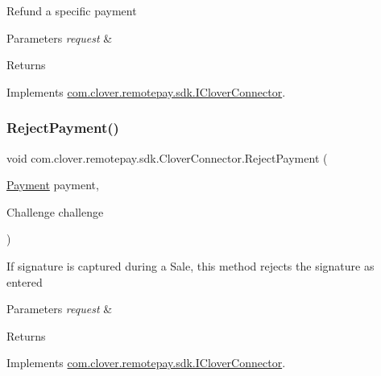 Refund a specific payment 


\begin{DoxyParams}{Parameters}
{\em request} & \\
\hline
\end{DoxyParams}
\begin{DoxyReturn}{Returns}

\end{DoxyReturn}


Implements \hyperlink{interfacecom_1_1clover_1_1remotepay_1_1sdk_1_1_i_clover_connector_aaa44684c7bf2c04b88ead61034c7c273}{com.\+clover.\+remotepay.\+sdk.\+I\+Clover\+Connector}.

\mbox{\label{classcom_1_1clover_1_1remotepay_1_1sdk_1_1_clover_connector_a2ffc66f46fddbf37d780ca269dd3b562}} 
\subsubsection{\texorpdfstring{Reject\+Payment()}{RejectPayment()}}
{\footnotesize\ttfamily void com.\+clover.\+remotepay.\+sdk.\+Clover\+Connector.\+Reject\+Payment (\begin{DoxyParamCaption}\item[{\hyperlink{classcom_1_1clover_1_1sdk_1_1v3_1_1payments_1_1_payment}{Payment}}]{payment,  }\item[{Challenge}]{challenge }\end{DoxyParamCaption})}



If signature is captured during a Sale, this method rejects the signature as entered 


\begin{DoxyParams}{Parameters}
{\em request} & \\
\hline
\end{DoxyParams}
\begin{DoxyReturn}{Returns}

\end{DoxyReturn}


Implements \hyperlink{interfacecom_1_1clover_1_1remotepay_1_1sdk_1_1_i_clover_connector_a6f4a1ae115140ff1cbc8b6d4a8f46be5}{com.\+clover.\+remotepay.\+sdk.\+I\+Clover\+Connector}.

